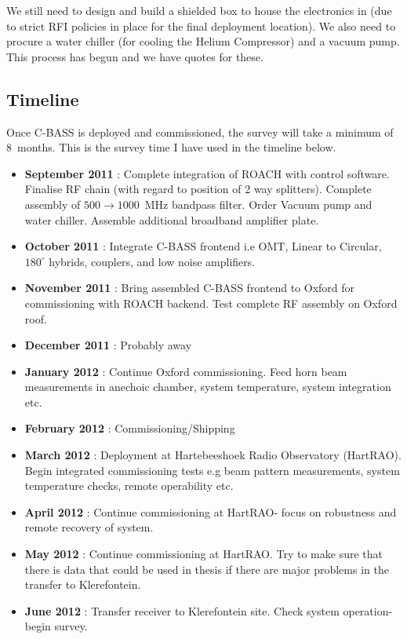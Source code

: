 We still need to design and build a shielded box to house the electronics in (due to strict RFI policies in place for the final deployment location). We also need to procure a water chiller (for cooling the Helium Compressor) and a vacuum pump. This process has begun and we have quotes for these.



\subsection{Timeline}


Once C-BASS is deployed and commissioned, the survey will take a minimum of 8~months. This is the survey time I have used in the timeline below.
\begin{itemize}
 \item \textbf{September 2011} : Complete integration of ROACH with control software. Finalise RF chain (with regard to position of 2 way splitters). Complete assembly of $500\rightarrow1000$~MHz bandpass filter. Order Vacuum pump and water chiller. Assemble additional broadband amplifier plate.
 \item \textbf{October 2011} : Integrate C-BASS frontend i.e OMT, Linear to Circular, $180^{\circ}$ hybrids, couplers, and low noise amplifiers.
 \item \textbf{November 2011} : Bring assembled C-BASS frontend to Oxford for commissioning with ROACH backend. Test complete RF assembly on Oxford roof.
 \item \textbf{December 2011} : Probably away
 \item \textbf{January 2012} : Continue Oxford commissioning. Feed horn beam measurements in anechoic chamber, system temperature, system integration etc.
 \item \textbf{February 2012} : Commissioning/Shipping
 \item \textbf{March 2012} : Deployment at Hartebeeshoek Radio Observatory (HartRAO). Begin integrated commissioning tests e.g beam pattern measurements, system temperature checks, remote operability etc.
 \item \textbf{April 2012} : Continue commissioning at HartRAO- focus on robustness and remote recovery of system.
 \item \textbf{May 2012} : Continue commissioning at HartRAO. Try to make sure that there is data that could be used in thesis if there are major problems in the transfer to Klerefontein.
 \item \textbf{June 2012} : Transfer receiver to Klerefontein site. Check system operation- begin survey.

\end{itemize}
